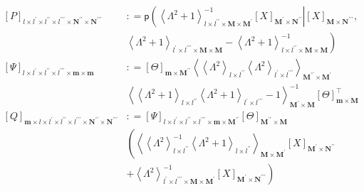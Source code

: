 \documentclass[preprint,12pt]{elsarticle}
\newcommand*{\M}[1]{\ensuremath{#1}\xspace}
\newcommand*{\x}{\times}
\newcommand*{\mi}[1]{\mathbf{#1}}
\newcommand*{\te}[2][]{\left\lbrack{#2}\right\rbrack_{#1}}
\newcommand*{\diag}[2][]{\left\langle{#2}\right\rangle_{#1}}
\newcommand*{\deq}{\M{\mathrel{\mathop:}=}}
\begin{document}
            \begin{equation*}
                \begin{aligned}
                    \te[l\x l^{\prime}\x l^{\prime\prime}\x l^{\prime\prime\prime}\x \mi{N^{\prime\prime}}\x \mi{N^{\prime\prime\prime}}]{P} &\deq
                    \mathsf{p} \left(
                    {\diag[l\x l^{\prime\prime}\x \mi{M}\x \mi{M^{\prime}}]{\Lambda^{2} + 1}^{-1} \te[\mi{M^{\prime}}\x\mi{N^{\prime\prime}}]{X}} \right\vert {\te[\mi{M}\x\mi{N^{\prime\prime\prime}}]{X}}, \\
                    &\left. {\diag[l^{\prime}\x l^{\prime\prime\prime}\x\mi{M}\x\mi{M}]{\Lambda^{2} + 1} - \diag[l\x l^{\prime\prime}\x\mi{M}\x\mi{M}]{\Lambda^{2} + 1}^{-1}} \right) \\
                    \te[l\x l^{\prime}\x l^{\prime\prime}\x l^{\prime\prime\prime}\x\mi{m}\x\mi{m}]{\Psi} &\deq \te[\mi{m}\x\mi{M^{\prime\prime}}]{\Theta} \diag[\mi{M^{\prime\prime}}\x\mi{M^{\prime}}]{\diag[l\x l^{\prime\prime}]{\Lambda^{2}} \diag[l^{\prime}\x l^{\prime\prime\prime}]{\Lambda^{2}}}\\ 
                    &\diag[\mi{M^{\prime}}\x\mi{M}]{\diag[l\x l^{\prime\prime}]{\Lambda^{2} + 1} \diag[l^{\prime}\x l^{\prime\prime\prime}]{\Lambda^{2} + 1} - 1}^{-1} \te[\mi{m}\x\mi{M}]{\Theta}^{\intercal}\\
                    \te[\mi{m}\x l\x l^{\prime}\x l^{\prime\prime}\x l^{\prime\prime\prime}\x \mi{N^{\prime\prime}}\x \mi{N^{\prime\prime\prime}}]{Q} &\deq \te[l\x l^{\prime}\x l^{\prime\prime}\x l^{\prime\prime\prime}\x\mi{m}\x\mi{M^{\prime\prime}}]{\Psi} \te[\mi{M^{\prime\prime}}\x\mi{M}]{\Theta} \\
                    &\left(\diag[\mi{M}\x\mi{M^{\prime}}]{\diag[l\x l^{\prime\prime}]{\Lambda^{2}}^{-1} {\diag[l\x l^{\prime\prime}]{\Lambda^{2} + 1}}} \te[\mi{M^{\prime}}\x\mi{N^{\prime\prime}}]{X} \right. \\
                    &\left. + {\diag[l^{\prime}\x l^{\prime\prime\prime}\x \mi{M}\x \mi{M^{\prime}}]{\Lambda^{2}}^{-1} \te[\mi{M^{\prime}}\x\mi{N^{\prime\prime\prime}}]{X}} \right)
                \end{aligned}
            \end{equation*}
\end{document}
